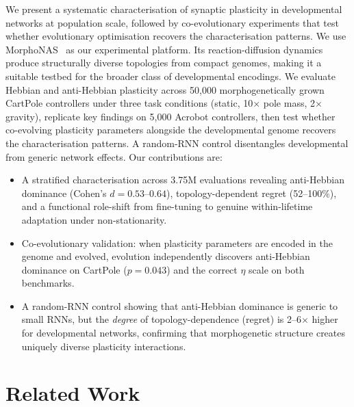 \documentclass[sigconf,nonacm]{acmart}
\begin{document}
We present a systematic characterisation of synaptic plasticity in developmental networks at population scale, followed by co-evolutionary experiments that test whether evolutionary optimisation recovers the characterisation patterns. We use MorphoNAS~\cite{glybovets2026morphonas} as our experimental platform. Its reaction-diffusion dynamics~\cite{turing1952chemical} produce structurally diverse topologies from compact genomes, making it a suitable testbed for the broader class of developmental encodings. We evaluate Hebbian and anti-Hebbian plasticity across 50{,}000 morphogenetically grown CartPole controllers under three task conditions (static, 10$\times$ pole mass, 2$\times$ gravity), replicate key findings on 5{,}000 Acrobot controllers, then test whether co-evolving plasticity parameters alongside the developmental genome recovers the characterisation patterns. A random-RNN control disentangles developmental from generic network effects. Our contributions are:

\begin{itemize}
  \item A stratified characterisation across 3.75M evaluations revealing anti-Hebbian dominance (Cohen's $d = 0.53$--$0.64$), topology-dependent regret (52--100\%), and a functional role-shift from fine-tuning to genuine within-lifetime adaptation under non-stationarity.
  \item Co-evolutionary validation: when plasticity parameters are encoded in the genome and evolved, evolution independently discovers anti-Hebbian dominance on CartPole ($p = 0.043$) and the correct $\eta$ scale on both benchmarks.
  \item A random-RNN control showing that anti-Hebbian dominance is generic to small RNNs, but the \emph{degree} of topology-dependence (regret) is 2--6$\times$ higher for developmental networks, confirming that morphogenetic structure creates uniquely diverse plasticity interactions.
\end{itemize}

\section{Related Work}
\label{sec:related}
\end{document}
